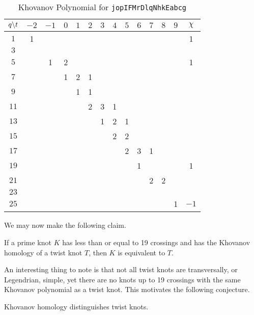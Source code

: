     \begin{table}
        \centering
        \begin{tabular}{| c | c | c | c | c | c | c | c | c | c | c | c | c | c |}
            \hline
            $q\symbol{92}t$&$-2$&$-1$&$0$&$1$&$2$&$3$&$4$&$5$&$6$&$7$&$8$&$9$&$\chi$\\
            \hline
            $1$&1&&&&&&&&&&&&1\\
            \hline
            $3$&&&&&&&&&&&&&\\
            \hline
            $5$&&1&2&&&&&&&&&&1\\
            \hline
            $7$&&&1&2&1&&&&&&&&\\
            \hline
            $9$&&&&1&1&&&&&&&&\\
            \hline
            $11$&&&&&2&3&1&&&&&&\\
            \hline
            $13$&&&&&&1&2&1&&&&&\\
            \hline
            $15$&&&&&&&2&2&&&&&\\
            \hline
            $17$&&&&&&&&2&3&1&&&\\
            \hline
            $19$&&&&&&&&&1&&&&1\\
            \hline
            $21$&&&&&&&&&&2&2&&\\
            \hline
            $23$&&&&&&&&&&&&&\\
            \hline
            $25$&&&&&&&&&&&&1&$-1$\\
            \hline
        \end{tabular}
        \caption{Khovanov Polynomial for \texttt{jopIFMrDlqNhkEabcg}}
        \label{table:jopIFMrDlqNhkEabcg_kho}
    \end{table}
    We may now make the following claim.
    \begin{theorem}
        If a prime knot $K$ has less than or equal to 19 crossings and has
        the Khovanov homology of a twist knot $T$,
        then $K$ is equivalent to $T$.
    \end{theorem}
    An interesting thing to note is that not all twist knots are
    transversally, or Legendrian, simple, yet there are no knots up to
    19 crossings with the same Khovanov polynomial as a twist knot. This
    motivates the following conjecture.
    \begin{conjecture}
        Khovanov homology distinguishes twist knots.
    \end{conjecture}
